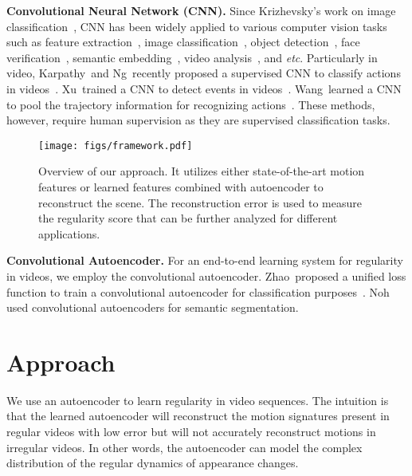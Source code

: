 \documentclass[10pt,twocolumn,letterpaper]{article}
\begin{document}
\vspace{.5em} \noindent
{\bf Convolutional Neural Network (CNN).}
Since Krizhevsky\etal's work on image classification~\cite{krizhevsky2012imagenet}, CNN has been widely applied to various computer vision tasks such as feature extraction~\cite{razavianASC14}, image classification~\cite{simonyanZ14}, object detection~\cite{deanRSSVY13,renHGS13}, face verification~\cite{taigmanYRW14}, semantic embedding~\cite{fromeCSBDRM13,karpathyF14}, video analysis~\cite{ranzatoSBMCC14,taylorFLB10}, and \emph{etc}. 
Particularly in video, Karpathy\etal~and Ng\etal~recently proposed a supervised CNN to classify actions in videos~\cite{karpathyTSLSF14,ngHVVMT15}. 
Xu\etal~trained a CNN to detect events in videos~\cite{xu2014discriminative}. 
Wang\etal~learned a CNN to pool the trajectory information for recognizing actions~\cite{wang2015action}. 
These methods, however, require human supervision as they are supervised classification tasks. 

\begin{figure*}[ht]
	\centering
	\texttt{[image: figs/framework.pdf]}
	\caption{Overview of our approach. It utilizes either state-of-the-art motion features or learned features combined with autoencoder to reconstruct the scene. The reconstruction error is used to measure the regularity score that can be further analyzed for different applications.}
	\vspace{-5mm}
	\label{fig:framework}
\end{figure*}





\vspace{.5em} \noindent
{\bf Convolutional Autoencoder.}
For an end-to-end learning system for regularity in videos, we employ the convolutional autoencoder.
Zhao\etal~proposed a unified loss function to train a convolutional autoencoder for classification purposes~\cite{zhaoMGL15}.
Noh\etal~\cite{nohHH15} used convolutional autoencoders for semantic segmentation.
 

\section{Approach}
\label{sec:approach}

We use an autoencoder to learn regularity in video sequences. 
The intuition is that the learned autoencoder will reconstruct the motion signatures present in regular videos with low error but will not accurately reconstruct motions in irregular videos. 
In other words, the autoencoder can model the complex distribution of the regular dynamics of appearance changes. 
\end{document}
